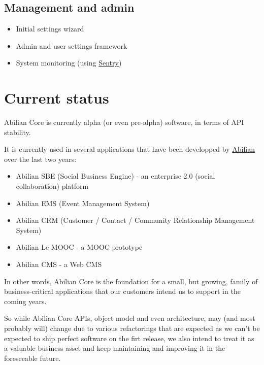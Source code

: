 \documentclass[a4paper,12pt,english]{sphinxmanual}
\begin{document}
\subsection{Management and admin}
\label{introduction:management-and-admin}\begin{itemize}
\item {} 
Initial settings wizard

\item {} 
Admin and user settings framework

\item {} 
System monitoring (using \href{https://getsentry.com/welcome/}{Sentry})

\end{itemize}


\section{Current status}
\label{introduction:current-status}
Abilian Core is currently alpha (or even pre-alpha) software, in terms
of API stability.

It is currently used in several applications that have been developped
by \href{http://www.abilian.com/}{Abilian} over the last two years:
\begin{itemize}
\item {} 
Abilian SBE (Social Business Engine) - an enterprise 2.0 (social
collaboration) platform

\item {} 
Abilian EMS (Event Management System)

\item {} 
Abilian CRM (Customer / Contact / Community Relationship Management
System)

\item {} 
Abilian Le MOOC - a MOOC prototype

\item {} 
Abilian CMS - a Web CMS

\end{itemize}

In other words, Abilian Core is the foundation for a small, but growing,
family of business-critical applications that our customers intend us to
support in the coming years.

So while Abilian Core APIs, object model and even architecture, may (and
most probably will) change due to various refactorings that are expected
as we can't be expected to ship perfect software on the firt release, we
also intend to treat it as a valuable business asset and keep
maintaining and improving it in the foreseeable future.
\end{document}
